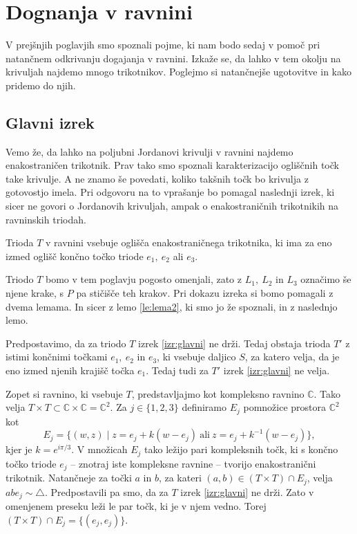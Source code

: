 \documentclass[mat1]{fmfdelo}
\newcommand{\C}{\mathbb C}
\begin{document}
\section{Dognanja v ravnini}
V prejšnjih poglavjih smo spoznali pojme, ki nam bodo sedaj v pomoč pri na\-tančnem odkrivanju dogajanja v ravnini. Izkaže se, da lahko v tem okolju na krivuljah najdemo mnogo trikotnikov. Poglejmo si natančnejše ugotovitve in kako pridemo do njih.
\subsection{Glavni izrek} 
Vemo že, da lahko na poljubni Jordanovi krivulji v ravnini najdemo enakostraničen trikotnik. Prav tako smo spoznali karakterizacijo ogliščnih točk take krivulje. A ne znamo še povedati, koliko takšnih točk bo krivulja z gotovostjo imela. Pri odgovoru na to vprašanje bo pomagal naslednji izrek, ki sicer ne govori o Jordanovih krivuljah, ampak o enakostraničnih trikotnikih na ravninskih triodah.
\begin{izrek}\label{izr:glavni}
Trioda $T$  v ravnini vsebuje oglišča enakostraničnega trikotnika, ki ima za eno izmed oglišč končno točko triode $e_1,\ e_2$ ali $e_3$.
\end{izrek}
Triodo $T$ bomo v tem poglavju pogosto omenjali, zato z $L_1,\ L_2$ in $L_3$ označimo še njene krake, s $P$ pa stičišče teh krakov. Pri dokazu izreka si bomo pomagali z dvema lemama. In sicer z lemo \ref{le:lema2}, ki smo jo že spoznali, in z naslednjo lemo.
\begin{lema}\label{le:protislovje}
Predpostavimo, da za triodo $T$ izrek \ref{izr:glavni} ne drži. Tedaj obstaja trioda $T'$ z istimi končnimi točkami $e_1,\ e_2$ in $e_3$, ki vsebuje daljico $S$, za katero velja, da je eno izmed njenih krajišč točka $e_1$. Tedaj tudi za $T'$ izrek \ref{izr:glavni} ne velja.
\end{lema}

\proof
Zopet si ravnino, ki vsebuje $T$, predstavljajmo kot kompleksno ravnino $\C$. Tako velja $T \times T \subset \C \times \C = \C^2$. Za $j \in \{1, 2, 3\}$ definiramo $E_j$ pomnožice prostora $\C^2$ kot
\[
E_j = \{(w, z) \mid z = e_j + k(w-e_j)\ \text{ali}\ z = e_j + k^{-1}(w-e_j)\},
\]
kjer je $k = e^{i\pi / 3}$. V množicah $E_j$ tako ležijo pari kompleksnih točk, ki s končno točko triode $e_j$ -- znotraj iste kompleksne ravnine -- tvorijo enakostranični trikotnik. Natančneje za točki $a$ in $b$, za kateri $(a, b) \in (T \times T) \cap E_j$, velja $abe_j \sim \triangle$. Predpostavili pa smo, da za $T$ izrek \ref{izr:glavni} ne drži. Zato v omenjenem preseku leži le par točk, ki je v njem vedno. Torej $(T \times T) \cap E_j = \{(e_j, e_j)\}$.
\end{document}
